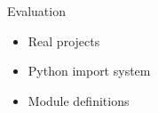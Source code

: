 \begin{frame}{Evaluation}
  \begin{itemize}
  \item Real projects
  \item Python import system
  \item Module definitions
  \end{itemize}
\end{frame}
